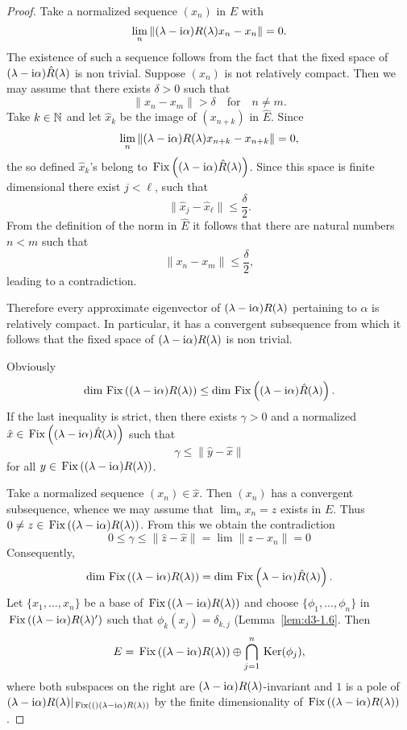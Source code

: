 \begin{proof}
Take a normalized sequence $(x_{n})$ in $E$ with
\[
\lim_{n}\|(\lambda - \mathrm{i}\alpha)R(\lambda)x_{n} - x_{n}\| = 0 .
\]
The existence of such a sequence follows from the fact that the fixed space of {$(\lambda-\mathrm{i}\alpha)\hat{R}(\lambda)$} is non trivial.
Suppose $(x_{n})$ is not relatively compact.
Then we may assume that there exists $\delta > 0$ such that
\[
	\|x_{n} - x_{m}\| > \delta \quad \text{for} \quad n \neq m .
\]
Take $k \in \mathbb{N} $ and let $\hat{x}_{k}$ be the image of $(x_{n+k})$ in $\hat{E}$.
Since
\[
	\lim_{n}\|(\lambda - \mathrm{i}\alpha)R(\lambda)x_{n+k} - x_{n+k}\| = 0 ,
\]
the so defined $\hat{x}_{k}$'s belong to $\mathop{}\mathrm{Fix}\left((\lambda - \mathrm{i}\alpha)\hat{R}(\lambda)\right)$.
Since this space is finite dimensional there exist $j < \ell$,  such that
\[
	\|\hat{x}_{j} - \hat{x}_{\ell}\| \leq \frac{\delta}{2} .
\]
From the definition of the norm in $\hat{E}$ it follows that there are natural numbers $n < m$ such that
\[
\|x_{n} - x_{m}\| \leq \frac{\delta}{2} ,
\]
leading to a contradiction.

Therefore every approximate eigenvector of $(\lambda - \mathrm{i}\alpha)R(\lambda)$ pertaining to $\alpha$ is relatively compact.
In particular, it has a convergent subsequence from which it follows that the fixed space of $(\lambda - \mathrm{i}\alpha)R(\lambda)$ is non trivial.

Obviously
\[
\dim \mathop{}\mathrm{Fix}\left((\lambda - \mathrm{i}\alpha)R(\lambda)\right) \leq \dim \mathop{}\mathrm{Fix}\left((\lambda - \mathrm{i}\alpha)\hat{R}(\lambda)\right) .
\]
If the last inequality is strict, then there exists $\gamma > 0$ and a normalized 
$\hat{x} \in \mathop{}\mathrm{Fix}\left((\lambda - \mathrm{i}\alpha)\hat{R}(\lambda)\right)$ such that
\[
\gamma \leq \|\hat{y} - \hat{x}\|
\]
for all $y \in \mathop{}\mathrm{Fix}\left((\lambda - \mathrm{i}\alpha)R(\lambda)\right)$.

Take a normalized sequence $(x_{n}) \in \hat{x}$.
Then $(x_{n})$ has a convergent subsequence, whence we may assume that $\lim_{n} x_{n} = z$ exists in $E$.
Thus $0 \neq z \in \mathop{}\mathrm{Fix}\left((\lambda - \mathrm{i}\alpha)R(\lambda)\right)$.
From this we obtain the contradiction
\[
 0 \leq \gamma \leq \|\hat{z} - \hat{x}\| = \lim \|z - x_{n}\| = 0
\]
Consequently,
\[
\dim \mathop{}\mathrm{Fix}\left((\lambda - \mathrm{i}\alpha)R(\lambda)\right) = \dim \mathop{}\mathrm{Fix}\left(\lambda - \mathrm{i}\alpha)\hat{R}(\lambda)\right).
\]
Let $\{x_{1},...,x_{n}\}$ be a base of 
$\mathop{}\mathrm{Fix}\left((\lambda - \mathrm{i}\alpha)R(\lambda)\right)$ and choose $\{\phi_{1},...,\phi_{n}\}$ in 
$\mathop{}\mathrm{Fix}\left((\lambda - \mathrm{i}\alpha)R(\lambda)'\right)$ such that $\phi_{k}(x_{j}) = \delta_{k,j}$ 
(Lemma~\ref{lem:d3-1.6}.
Then
\[
E = \mathop{}\mathrm{Fix}\left((\lambda - \mathrm{i}\alpha)R(\lambda)\right) \oplus \bigcap_{j=1}^{n} \mathop{}\mathrm{Ker}(\phi_{j}),
\]
where both subspaces on the right are 
$(\lambda - \mathrm{i}\alpha)R(\lambda)$-invariant and $1$ is a pole of 
$(\lambda-\mathrm{i}\alpha)R(\lambda)|_{\mathop{}\mathrm{Fix}\left((\right)(\lambda-\mathrm{i}\alpha)R(\lambda))}$ 
by the finite dimensionality of $\mathop{}\mathrm{Fix}\left((\lambda - \mathrm{i}\alpha)R(\lambda)\right)$.


\end{proof}

